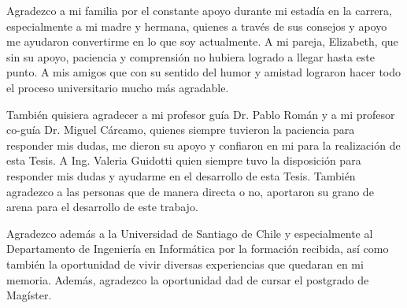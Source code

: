 \begin{agradecimiento}
Agradezco a mi familia por el constante apoyo durante mi estadía en la carrera, especialmente a mi madre y hermana, quienes a través de sus consejos y apoyo me ayudaron convertirme en lo que soy actualmente. A mi pareja, Elizabeth, que sin su apoyo, paciencia y comprensión no hubiera logrado a llegar hasta este punto. A mis amigos que con su sentido del humor y amistad lograron hacer todo el proceso universitario mucho más agradable. 

También quisiera agradecer a mi profesor guía  Dr. Pablo Román y a mi profesor co-guía Dr. Miguel Cárcamo, quienes siempre tuvieron la paciencia para responder mis dudas, me dieron su apoyo y confiaron en mi para la realización de esta Tesis. A Ing. Valeria Guidotti quien siempre tuvo la disposición para responder mis dudas y ayudarme en el desarrollo de esta Tesis. También agradezco a las personas que de manera directa o no, aportaron su grano de arena para el desarrollo de este trabajo.

Agradezco además a la Universidad de Santiago de Chile y especialmente al Departamento de Ingeniería en Informática por la formación recibida, así como también la oportunidad de vivir diversas experiencias que quedaran en mi memoria. Además, agradezco la oportunidad dad de cursar el postgrado de Magíster. 
\end{agradecimiento}